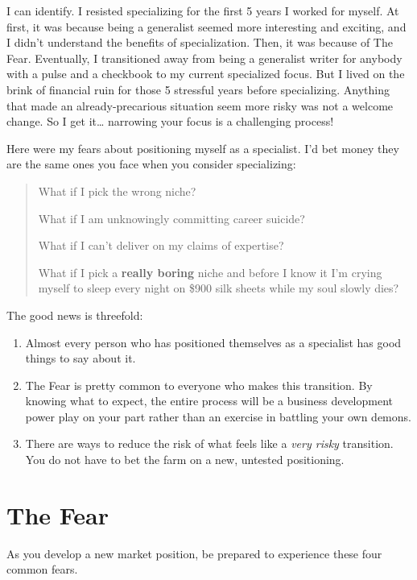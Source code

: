 I can identify. I resisted specializing for the first 5 years I worked for myself. At first, it was because being a generalist seemed more interesting and exciting, and I didn't understand the benefits of specialization. Then, it was because of The Fear. Eventually, I transitioned away from being a generalist writer for anybody with a pulse and a checkbook to my current specialized focus. But I lived on the brink of financial ruin for those 5 stressful years before specializing. Anything that made an already-precarious situation seem more risky was not a welcome change. So I get it\ldots{} narrowing your focus is a challenging process!

Here were my fears about positioning myself as a specialist. I'd bet money they are the same ones you face when you consider specializing:

\begin{quotation}
What if I pick the wrong niche?

What if I am unknowingly committing career suicide?

What if I can't deliver on my claims of expertise?

What if I pick a \textbf{really boring} niche and before I know it I'm crying myself to sleep every night on \$900 silk sheets while my soul slowly dies?
\end{quotation}

The good news is threefold:

\begin{enumerate}
\item Almost every person who has positioned themselves as a specialist has good things to say about it.
\item The Fear is pretty common to everyone who makes this transition. By knowing what to expect, the entire process will be a business development power play on your part rather than an exercise in battling your own demons.
\item There are ways to reduce the risk of what feels like a \emph{very risky} transition. You do not have to bet the farm on a new, untested positioning.
\end{enumerate}

\section{The Fear}

As you develop a new market position, be prepared to experience these four common fears.

